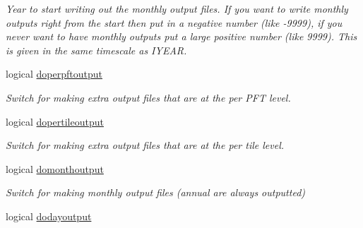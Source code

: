 \begin{DoxyCompactItemize}
\begin{DoxyCompactList}\small\item\em Year to start writing out the monthly output files. If you want to write monthly outputs right from the start then put in a negative number (like -\/9999), if you never want to have monthly outputs put a large positive number (like 9999). This is given in the same timescale as I\+Y\+E\+A\+R. \end{DoxyCompactList}\item 
\hypertarget{structctem__statevars_1_1ctem__switches_a1b6607120fb9c5497adbab9c8730f5b4}{}logical \hyperlink{structctem__statevars_1_1ctem__switches_a1b6607120fb9c5497adbab9c8730f5b4}{doperpftoutput}\label{structctem__statevars_1_1ctem__switches_a1b6607120fb9c5497adbab9c8730f5b4}

\begin{DoxyCompactList}\small\item\em Switch for making extra output files that are at the per P\+F\+T level. \end{DoxyCompactList}\item 
\hypertarget{structctem__statevars_1_1ctem__switches_a1924e505ca103581172e57bf31e6d19b}{}logical \hyperlink{structctem__statevars_1_1ctem__switches_a1924e505ca103581172e57bf31e6d19b}{dopertileoutput}\label{structctem__statevars_1_1ctem__switches_a1924e505ca103581172e57bf31e6d19b}

\begin{DoxyCompactList}\small\item\em Switch for making extra output files that are at the per tile level. \end{DoxyCompactList}\item 
\hypertarget{structctem__statevars_1_1ctem__switches_a34dbd55de80592ffc606195bfa8fc404}{}logical \hyperlink{structctem__statevars_1_1ctem__switches_a34dbd55de80592ffc606195bfa8fc404}{domonthoutput}\label{structctem__statevars_1_1ctem__switches_a34dbd55de80592ffc606195bfa8fc404}

\begin{DoxyCompactList}\small\item\em Switch for making monthly output files (annual are always outputted) \end{DoxyCompactList}\item 
\hypertarget{structctem__statevars_1_1ctem__switches_ae21ffc34732c1e7a342885f8b2f7ad01}{}logical \hyperlink{structctem__statevars_1_1ctem__switches_ae21ffc34732c1e7a342885f8b2f7ad01}{dodayoutput}\label{structctem__statevars_1_1ctem__switches_ae21ffc34732c1e7a342885f8b2f7ad01}


\end{DoxyCompactItemize}
